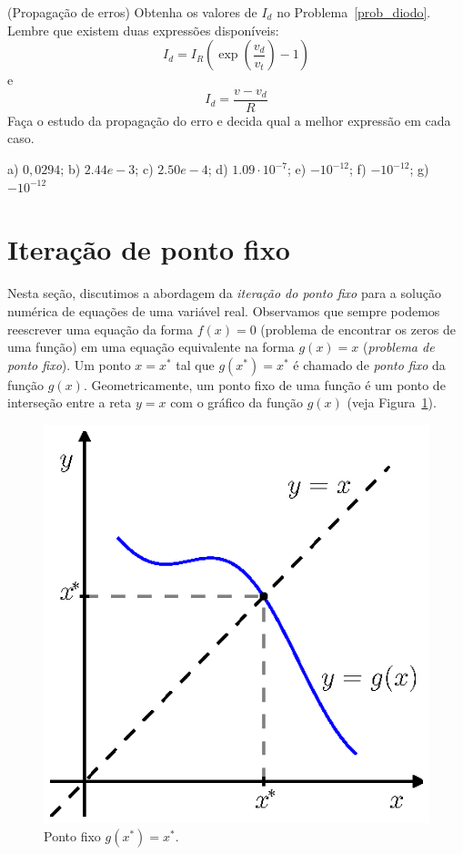 \begin{exer}(Propagação de erros) Obtenha os valores de $I_d$ no Problema~\ref{prob_diodo}. Lembre que existem duas expressões disponíveis:
  \begin{equation*}
    I_d=I_R\left(\exp\left(\frac{v_d}{v_t}\right)-1\right)  
  \end{equation*}
e
\begin{equation*}
  I_d=\frac{v-v_d}{R}
\end{equation*}
Faça o estudo da propagação do erro e decida qual a melhor expressão em cada caso.
\end{exer}
\begin{resp}
  a) $0,0294$; b) $2.44e-3$; c) $2.50e-4$; d) $1.09\cdot 10^{-7}$; e) $- 10^{-12}$; f) $-10^{-12}$; g) $- 10^{-12}$  
\end{resp}

\section{Iteração de ponto fixo}

Nesta seção, discutimos a abordagem da \emph{iteração do ponto fixo} para a solução numérica de equações de uma variável real. Observamos que sempre podemos reescrever uma equação da forma $f(x) = 0$ (problema de encontrar os zeros de uma função) em uma equação equivalente na forma $g(x) = x$ (\emph{problema de ponto fixo}). Um ponto $x = x^*$ tal que $g(x^*) = x^*$ é chamado de \emph{ponto fixo} da função $g(x)$. Geometricamente, um ponto fixo de uma função é um ponto de interseção entre a reta $y = x$ com o gráfico da função $g(x)$ (veja Figura~\ref{fig:defn_ponto_fixo}).

\begin{figure}[h]
  \centering
  \includegraphics{./cap_equacao1d/pics/defn_ponto_fixo/defn_ponto_fixo.eps}
  \caption{Ponto fixo $g(x^*) = x^*$.}
  \label{fig:defn_ponto_fixo}
\end{figure}

